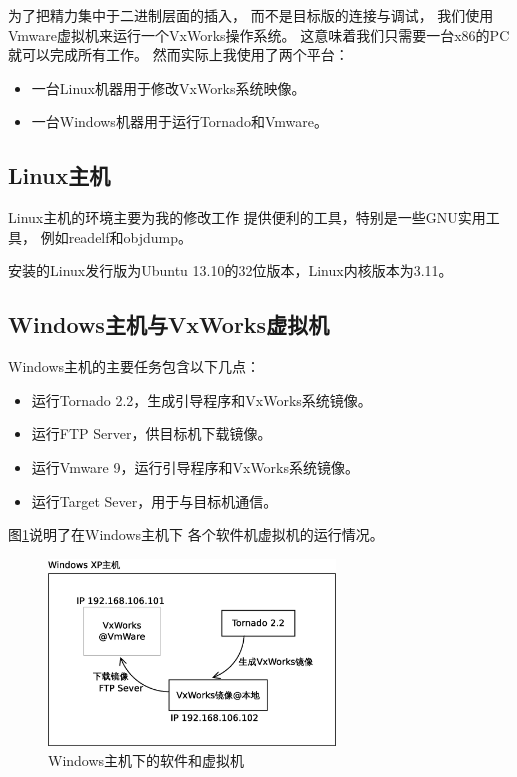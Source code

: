 为了把精力集中于二进制层面的插入，
而不是目标版的连接与调试，
我们使用Vmware虚拟机来运行一个VxWorks操作系统。
这意味着我们只需要一台x86的PC就可以完成所有工作。
然而实际上我使用了两个平台：
\begin{itemize}
  \item 一台Linux机器用于修改VxWorks系统映像。
  \item 一台Windows机器用于运行Tornado和Vmware。
\end{itemize}

\subsection{Linux主机}

Linux主机的环境主要为我的修改工作
提供便利的工具，特别是一些GNU实用工具，
例如readelf和objdump。

安装的Linux发行版为Ubuntu 13.10的32位版本，Linux内核版本为3.11。

\subsection{Windows主机与VxWorks虚拟机}

Windows主机的主要任务包含以下几点：

\begin{itemize}
  \item 运行Tornado 2.2，生成引导程序和VxWorks系统镜像。
  \item 运行FTP Server，供目标机下载镜像。
  \item 运行Vmware 9，运行引导程序和VxWorks系统镜像。
  \item 运行Target Sever，用于与目标机通信。
\end{itemize}

图\ref{win}说明了在Windows主机下
各个软件机虚拟机的运行情况。

\begin{figure}[h!]
    \centering
    \includegraphics[width=0.68\textwidth]{figure/win.eps}
    \caption{Windows主机下的软件和虚拟机}
    \label{win}
\end{figure}

